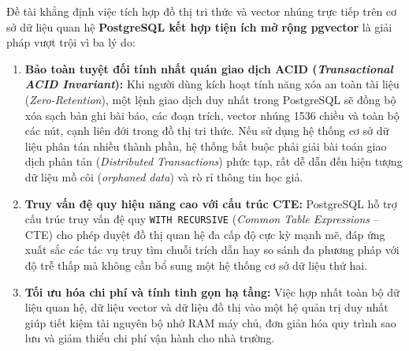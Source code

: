 Đề tài khẳng định việc tích hợp đồ thị tri thức và vector nhúng trực tiếp trên cơ sở dữ liệu quan hệ \textbf{PostgreSQL kết hợp tiện ích mở rộng pgvector} là giải pháp vượt trội vì ba lý do:
\begin{enumerate}[label=\textbf{(\arabic*)}]
    \item \textbf{Bảo toàn tuyệt đối tính nhất quán giao dịch ACID (\textit{Transactional ACID Invariant}):} Khi người dùng kích hoạt tính năng xóa an toàn tài liệu (\textit{Zero-Retention}), một lệnh giao dịch duy nhất trong PostgreSQL sẽ đồng bộ xóa sạch bản ghi bài báo, các đoạn trích, vector nhúng 1536 chiều và toàn bộ các nút, cạnh liên đới trong đồ thị tri thức. Nếu sử dụng hệ thống cơ sở dữ liệu phân tán nhiều thành phần, hệ thống bắt buộc phải giải bài toán giao dịch phân tán (\textit{Distributed Transactions}) phức tạp, rất dễ dẫn đến hiện tượng dữ liệu mồ côi (\textit{orphaned data}) và rò rỉ thông tin học giả.
    \item \textbf{Truy vấn đệ quy hiệu năng cao với cấu trúc CTE:} PostgreSQL hỗ trợ cấu trúc truy vấn đệ quy \texttt{WITH RECURSIVE} (\textit{Common Table Expressions} -- CTE) cho phép duyệt đồ thị quan hệ đa cấp độ cực kỳ mạnh mẽ, đáp ứng xuất sắc các tác vụ truy tìm chuỗi trích dẫn hay so sánh đa phương pháp với độ trễ thấp mà không cần bổ sung một hệ thống cơ sở dữ liệu thứ hai.
    \item \textbf{Tối ưu hóa chi phí và tính tinh gọn hạ tầng:} Việc hợp nhất toàn bộ dữ liệu quan hệ, dữ liệu vector và dữ liệu đồ thị vào một hệ quản trị duy nhất giúp tiết kiệm tài nguyên bộ nhớ RAM máy chủ, đơn giản hóa quy trình sao lưu và giảm thiểu chi phí vận hành cho nhà trường.
\end{enumerate}
